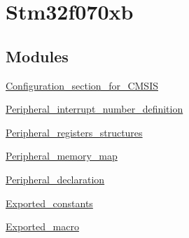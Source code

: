 \hypertarget{group__stm32f070xb}{}\section{Stm32f070xb}
\label{group__stm32f070xb}
\subsection*{Modules}
\begin{DoxyCompactItemize}
\item 
\hyperlink{group___configuration__section__for___c_m_s_i_s}{Configuration\+\_\+section\+\_\+for\+\_\+\+C\+M\+S\+IS}
\item 
\hyperlink{group___peripheral__interrupt__number__definition}{Peripheral\+\_\+interrupt\+\_\+number\+\_\+definition}
\item 
\hyperlink{group___peripheral__registers__structures}{Peripheral\+\_\+registers\+\_\+structures}
\item 
\hyperlink{group___peripheral__memory__map}{Peripheral\+\_\+memory\+\_\+map}
\item 
\hyperlink{group___peripheral__declaration}{Peripheral\+\_\+declaration}
\item 
\hyperlink{group___exported__constants}{Exported\+\_\+constants}
\item 
\hyperlink{group___exported__macro}{Exported\+\_\+macro}
\end{DoxyCompactItemize}
